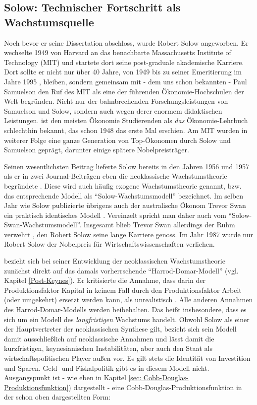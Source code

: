 \subsection{Solow: Technischer Fortschritt als Wachstumsquelle} \label{sec: Solow-Modell}
Noch bevor er seine Dissertation abschloss, wurde Robert Solow angeworben. Er wechselte 1949 von Harvard an das benachbarte Massachusetts Institute of Technology (MIT) und startete dort seine post-graduale akademische Karriere. Dort sollte er nicht nur über 40 Jahre, von 1949 bis zu seiner Emeritierung im Jahre 1995 \parencite{Solow1987a}, bleiben, sondern gemeinsam mit - dem uns schon bekannten - Paul Samuelson den Ruf des MIT als eine der führenden Ökonomie-Hochschulen der Welt begründen. Nicht nur der bahnbrechenden Forschungsleistungen von Samuelson und Solow, sondern auch wegen derer enormem didaktischen Leistungen. \textcite{Samuelson1998} ist den meisten Ökonomie Studierenden als \textit{das} Ökonomie-Lehrbuch schlechthin bekannt, das schon 1948 das erste Mal erschien. Am MIT wurden in weiterer Folge eine ganze Generation von Top-Ökonomen durch Solow und Samuelson geprägt, darunter einige spätere Nobelpreisträger.

Seinen wesentlichsten Beitrag lieferte Solow bereits in den Jahren 1956 und 1957 als er in zwei Journal-Beiträgen eben die neoklassische Wachstumstheorie begründete \parencite{Solow1956, Solow1957}. Diese wird auch häufig exogene Wachstumstheorie genannt, bzw. das entsprechende Modell als "`Solow-Wachstumsmodell"' bezeichnet. Im selben Jahr wie Solow publizierte übrigens auch der australische Ökonom Trevor Swan ein praktisch identisches Modell \parencite{Swan1956}. Vereinzelt spricht man daher auch vom "`Solow-Swan-Wachstumsmodell"'. Insgesamt blieb Trevor Swan allerdings der Ruhm verwehrt \parencite{Dimand2009}, den Robert Solow seine lange Karriere genoss. Im Jahr 1987 wurde nur Robert Solow der Nobelpreis für Wirtschaftswissenschaften verliehen. 

\textcite{Solow1956} bezieht sich bei seiner Entwicklung der neoklassischen Wachstumstheorie zunächst direkt auf das damals vorherrschende "`Harrod-Domar-Modell"' (vgl. Kapitel \ref{Post-Keynes}). Er kritisierte die Annahme, dass darin der Produktionsfaktor Kapital in keinem Fall durch den Produktionsfaktor Arbeit (oder umgekehrt) ersetzt werden kann, als unrealistisch \parencite[S. 65]{Solow1956}. Alle anderen Annahmen des Harrod-Domar-Modells werden beibehalten. Das heißt insbesondere, dass es sich um ein Modell des \textit{langfristigen} Wachstums handelt. Obwohl Solow als einer der Hauptvertreter der neoklassischen Synthese gilt, bezieht sich sein Modell damit ausschließlich auf neoklassische Annahmen \parencite[S. 91]{Solow1956} und lässt damit die kurzfristigen, keynesianischen Instabilitäten, aber auch den Staat als wirtschaftspolitischen Player außen vor. Es gilt stets die Identität von Investition und Sparen. Geld- und Fiskalpolitik gibt es in diesem Modell nicht. Ausgangspunkt ist - wie eben in Kapitel \ref{sec: Cobb-Douglas-Produktionsfunktion}) dargestellt - eine Cobb-Douglas-Produktionsfunktion in der schon oben dargestellten Form:

